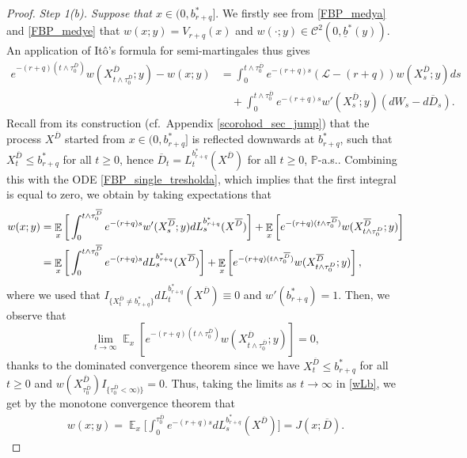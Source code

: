 \documentclass[11pt]{article} %
\DeclareMathOperator{\E}{\mathbb E}
\newcommand{\ubar}[1]{\underaccent{\bar}{#1}}
\numberwithin{komcounter}{section}
\renewcommand{\ubar}{\underline}
\renewcommand{\bar}{\overline}
\numberwithin{equation}{section}
\numberwithin{theorem}{section}
\begin{document}
\begin{proof}
\vspace{1mm}
{\it Step 1(b). Suppose that $x\in (0,b^*_{r+q}]$}. 
We firstly see from \eqref{FBP_medya} and \eqref{FBP_medye} that $w(x;y)=V_{r+q}(x)$ and $w(\cdot;y) \in  \mathcal{C}^2(0,\ubar{b}^*(y))$. 
An application of It\^{o}'s formula for semi-martingales \cite[p.~74]{Peskir} thus gives 
\begin{align*}
e^{- (r+q) (t \wedge \tau_0^{\bar{D}})} w(X^{\bar{D}}_{t\wedge\tau_0^{\bar{D}}};y) - w(x;y)
&= \int_0^{t\wedge \tau_0^{\bar{D}}} e^{-(r+q)s} (\mathcal{L}-(r+q)) w(X^{\bar D}_s;y)ds \\
&\quad + \int_0^{t\wedge \tau_0^{\bar D}} e^{-(r+q)s} w'(X^{\bar D}_s;y) (dW_s - d\bar D_s).
\end{align*}
Recall from its construction (cf.~Appendix \ref{scorohod_sec_jump}) that the process $X^{\bar D}$ started from $x\in (0,b^*_{r+q}]$ is reflected downwards at $b^*_{r+q}$, such that $X^{\bar D}_t \leq b^*_{r+q}$ for all $t\geq 0$, hence $\bar D_t = L^{b^*_{r+q}}_t(X^{\bar D})$ for all $t\geq 0$, $\mathbb{P}$-a.s.. 
Combining this with the ODE \eqref{FBP_single_tresholda}, which implies that the first integral is equal to zero, we obtain by taking expectations that 
\begin{align}
w(x;y) 
&= \E_x \bigg[\int_0^{t \wedge \tau^{\bar D}_0} e^{-(r+q)s} w'(X^{\bar D}_s;y) dL^{b^*_{r+q}}_s(X^{\bar D}) \bigg] 
+ \E_x\left[ e^{-(r+q) (t\wedge\tau_0^{\bar D})} w(X^{\bar D}_{t\wedge\tau_0^D};y) \right] \notag\\ 
&= \E_x \bigg[ \int_0^{t\wedge\tau^{\bar D}_0} e^{-(r+q)s} dL^{b^*_{r+q}}_s(X^{\bar D}) \bigg] 
+ \E_x\left[ e^{-(r+q) (t\wedge\tau_0^{\bar D})} w(X^{\bar D}_{t\wedge\tau_0^D};y) \right], 
\label{wLb}
\end{align}
where we used that $I_{\{X^{\bar D}_t \neq b^*_{r+q}\}} dL^{b^*_{r+q}}_t(X^{\bar D}) \equiv 0$ and $w'(b^*_{r+q}) = 1$. 
Then, we observe that 
$$
\lim_{t\to\infty} \E_x \left[e^{-(r+q)(t\wedge\tau_0^{\bar D})} w(X^{\bar D}_{t\wedge\tau_0^{\bar D}};y) \right] = 0,
$$ 
thanks to the dominated convergence theorem since we have $X^{\bar D}_t\leq b^*_{r+q}$ for all $t\geq 0$ and $w(X^{\bar D}_{\tau_0^{\bar D}})I_{\{\tau^{\bar D}_0 < \infty)\}}=0$.
Thus, taking the limits as $t\to \infty$ in \eqref{wLb}, we get by the monotone convergence theorem that
\begin{align*}
w(x;y) = 
\E_x \bigg[ \int_0^{\tau^{\bar D}_0} e^{-(r+q)s} dL^{b^*_{r+q}}_s(X^{\bar D}) \bigg] 
=J(x;\bar D).
\end{align*}


\end{proof}
\end{document}

